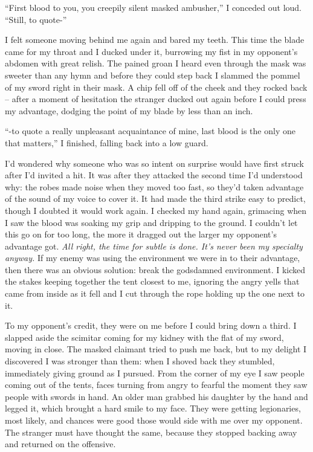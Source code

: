 \documentclass[12pt, openany]{book}
\begin{document}
“First blood to you, you creepily silent masked ambusher,” I conceded out loud. “Still, to quote-”

I felt someone moving behind me again and bared my teeth. This time the blade came for my throat and I ducked under it, burrowing my fist in my opponent’s abdomen with great relish. The pained groan I heard even through the mask was sweeter than any hymn and before they could step back I slammed the pommel of my sword right in their mask. A chip fell off of the cheek and they rocked back – after a moment of hesitation the stranger ducked out again before I could press my advantage, dodging the point of my blade by less than an inch.

“-to quote a really unpleasant acquaintance of mine, last blood is the only one that matters,” I finished, falling back into a low guard.

I’d wondered why someone who was so intent on surprise would have first struck after I’d invited a hit. It was after they attacked the second time I’d understood why: the robes made noise when they moved too fast, so they’d taken advantage of the sound of my voice to cover it. It had made the third strike easy to predict, though I doubted it would work again. I checked my hand again, grimacing when I saw the blood was soaking my grip and dripping to the ground. I couldn’t let this go on for too long, the more it dragged out the larger my opponent’s advantage got. \textit{All right, the time for subtle is done. It’s never been my specialty anyway.} If my enemy was using the environment we were in to their advantage, then there was an obvious solution: break the godsdamned environment. I kicked the stakes keeping together the tent closest to me, ignoring the angry yells that came from inside as it fell and I cut through the rope holding up the one next to it.

To my opponent’s credit, they were on me before I could bring down a third. I slapped aside the scimitar coming for my kidney with the flat of my sword, moving in close. The masked claimant tried to push me back, but to my delight I discovered I was stronger than them: when I shoved back they stumbled, immediately giving ground as I pursued. From the corner of my eye I saw people coming out of the tents, faces turning from angry to fearful the moment they saw people with swords in hand. An older man grabbed his daughter by the hand and legged it, which brought a hard smile to my face. They were getting legionaries, most likely, and chances were good those would side with me over my opponent. The stranger must have thought the same, because they stopped backing away and returned on the offensive.
\end{document}
